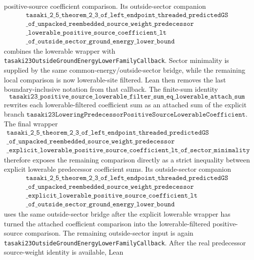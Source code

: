 \documentclass[a4paper,11pt]{article}
\begin{document}
positive-source coefficient comparison.
Its outside-sector companion
\[
\begin{gathered}
\texttt{tasaki\_2\_5\_theorem\_2\_3\_of\_left\_endpoint\_threaded\_predictedGS}\\
\texttt{\_of\_unpacked\_reembedded\_source\_weight\_predecessor}\\
\texttt{\_lowerable\_positive\_source\_coefficient\_lt}\\
\texttt{\_of\_outside\_sector\_ground\_energy\_lower\_bound}
\end{gathered}
\]
combines the lowerable wrapper with
\texttt{tasaki23OutsideGroundEnergyLowerFamilyCallback}.  Sector minimality
is supplied by the same common-energy/outside-sector bridge, while the
remaining local comparison is now lowerable-site filtered.
Lean then removes the last boundary-inclusive notation from that
callback.  The finite-sum identity
\[
\texttt{tasaki23\_positive\_source\_lowerable\_filter\_sum\_eq\_lowerable\_attach\_sum}
\]
rewrites each lowerable-filtered coefficient sum as an attached sum of
the explicit branch
\(\texttt{tasaki23LoweringPredecessorPositiveSourceLowerableCoefficient}\).
The final wrapper
\[
\begin{gathered}
\texttt{tasaki\_2\_5\_theorem\_2\_3\_of\_left\_endpoint\_threaded\_predictedGS}\\
\texttt{\_of\_unpacked\_reembedded\_source\_weight\_predecessor}\\
\texttt{\_explicit\_lowerable\_positive\_source\_coefficient\_lt\_of\_sector\_minimality}
\end{gathered}
\]
therefore exposes the remaining comparison directly as a strict
inequality between explicit lowerable predecessor coefficient sums.
Its outside-sector companion
\[
\begin{gathered}
\texttt{tasaki\_2\_5\_theorem\_2\_3\_of\_left\_endpoint\_threaded\_predictedGS}\\
\texttt{\_of\_unpacked\_reembedded\_source\_weight\_predecessor}\\
\texttt{\_explicit\_lowerable\_positive\_source\_coefficient\_lt}\\
\texttt{\_of\_outside\_sector\_ground\_energy\_lower\_bound}
\end{gathered}
\]
uses the same outside-sector bridge after the explicit lowerable wrapper has
turned the attached coefficient comparison into the lowerable-filtered
positive-source comparison.  The remaining outside-sector input is again
\texttt{tasaki23OutsideGroundEnergyLowerFamilyCallback}.
After the real predecessor source-weight identity is available, Lean
\end{document}
